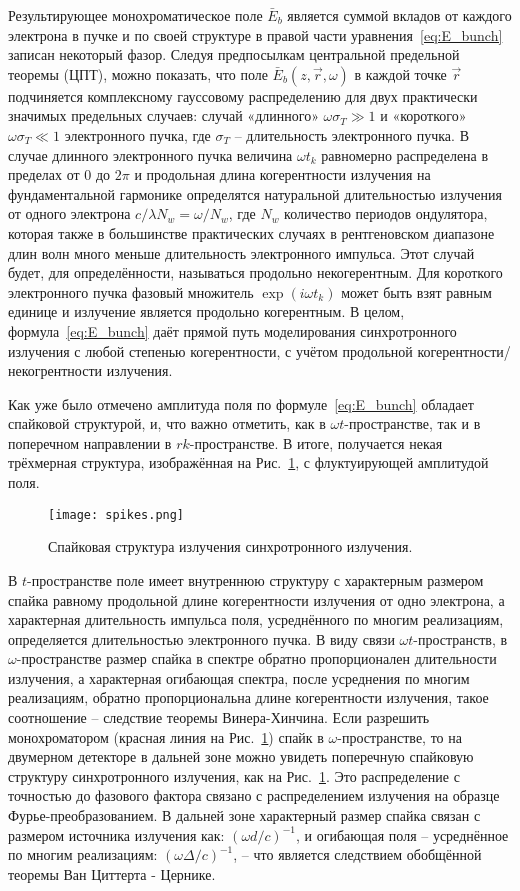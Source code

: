 Результирующее монохроматическое поле $\bar{E}_{b}$ является суммой вкладов от каждого электрона в пучке и по своей структуре в правой части уравнения~\ref{eq:E_bunch} записан некоторый фазор. Следуя предпосылкам центральной предельной теоремы (ЦПТ), можно показать, что поле $\bar{E}_{b}(z, \vec{r}, \omega)$ в каждой точке $\vec{r}$ подчиняется комплексному гауссовому распределению для двух практически значимых предельных случаев: случай «длинного» $\omega\sigma_T \gg 1$ и «короткого»  $\omega\sigma_T \ll 1$ электронного пучка, где $\sigma_T$ -- длительность электронного пучка. В случае длинного электронного пучка величина $\omega t_k$ равномерно распределена в пределах от $0$ до $2\pi$ и продольная длина когерентности излучения на фундаментальной гармонике определятся натуральной длительностью излучения от одного электрона $c/\lambda N_w = \omega / N_w$, где $N_w$ количество периодов ондулятора, которая также в большинстве практических случаях в рентгеновском диапазоне длин волн много меньше длительность электронного импульса. Этот случай будет, для определённости, называться продольно некогерентным. Для короткого электронного пучка фазовый множитель $\exp{(i \omega t_k)}$ может быть взят равным единице и излучение является продольно когерентным. В целом, формула~\ref{eq:E_bunch} даёт прямой путь моделирования синхротронного излучения с любой степенью когерентности, с учётом продольной когерентности/некогрентности излучения.

Как уже было отмечено амплитуда поля по формуле~\ref{eq:E_bunch} обладает спайковой структурой, и, что важно отметить, как в $\omega t$-пространстве, так и в поперечном направлении в $rk$-пространстве. В итоге, получается некая трёхмерная структура, изображённая на Рис.~\ref{fig:spikes}, с флуктуирующей амплитудой поля. 
\begin{figure}
	\centering 	\texttt{[image: spikes.png]}
	\caption{Спайковая структура излучения синхротронного излучения.}
	\label{fig:spikes}
\end{figure}

В $t$-пространстве поле имеет внутреннюю структуру с характерным размером спайка равному продольной длине когерентности излучения от одно электрона, а характерная длительность импульса поля, усреднённого по многим реализациям, определяется длительностью электронного пучка. В виду связи $\omega t$-пространств, в $\omega$-пространстве размер спайка в спектре обратно пропорционален длительности излучения, а характерная огибающая спектра, после усреднения по многим реализациям, обратно пропорциональна длине когерентности излучения, такое соотношение -- следствие теоремы Винера-Хинчина. Если разрешить монохроматором (красная линия на Рис.~\ref{fig:spikes}) спайк в $\omega$-пространстве, то на двумерном детекторе в дальней зоне можно увидеть поперечную спайковую структуру синхротронного излучения, как на Рис.~\ref{fig:spikes}. Это распределение с точностью до фазового фактора связано с распределением излучения на образце Фурье-преобразованием. В дальней зоне характерный размер спайка связан с размером источника излучения как:  $(\omega d /c)^{-1}$, и огибающая поля -- усреднённое по многим реализациям: $(\omega \Delta /c)^{-1}$, -- что является следствием обобщённой теоремы Ван Циттерта - Цернике. 


\newpage






